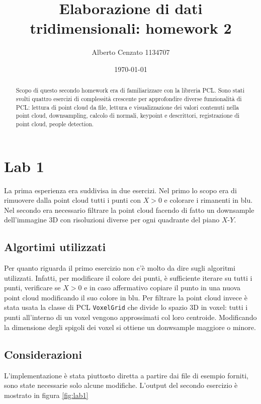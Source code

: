 \documentclass[a4paper]{article}
\title{Elaborazione di dati tridimensionali: homework 2}
\author{Alberto Cenzato 1134707}
\date{\today}
\begin{document}
\maketitle

\begin{abstract}
Scopo di questo secondo homework era di familiarizzare con la libreria PCL. Sono stati svolti quattro esercizi di complessità crescente per approfondire diverse funzionalità di PCL: lettura di point cloud da file, lettura e visualizzazione dei valori contenuti nella point cloud, downsampling, calcolo di normali, keypoint e descrittori, registrazione di point cloud, people detection.
\end{abstract}

\section{Lab 1} \label{sec:lab1}
La prima esperienza era suddivisa in due esercizi. Nel primo lo scopo era di rimuovere dalla point cloud tutti i punti con $X > 0$ e colorare i rimanenti in blu. Nel secondo era necessario filtrare la point cloud facendo di fatto un downsample dell'immagine 3D con risoluzioni diverse per ogni quadrante del piano $X$-$Y$.

	\subsection{Algortimi utilizzati} \label{sec:lab1_alg}
	Per quanto riguarda il primo esercizio non c'è molto da dire sugli algoritmi utilizzati. Infatti, per modificare il colore dei punti, è sufficiente iterare su tutti i punti, verificare se $X > 0$ e in caso affermativo copiare il punto in una nuova point cloud modificando il suo colore in blu. 
	Per filtrare la point cloud invece è stata usata la classe di PCL \verb|VoxelGrid| che divide lo spazio 3D in voxel: tutti i punti all'interno di un voxel vengono approssimati col loro centroide. Modificando la dimensione degli spigoli dei voxel si ottiene un donwsample maggiore o minore.
	
	\subsection{Considerazioni} \label{sec:lab1_disc}
	L'implementazione è stata piuttosto diretta a partire dai file di esempio forniti, sono state necessarie solo alcune modifiche. L'output del secondo esercizio è mostrato in figura \ref{fig:lab1} 
	
\end{document}

